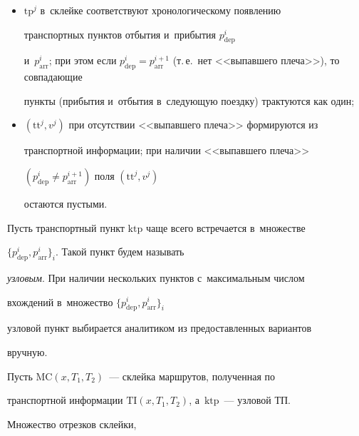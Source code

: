\begin{itemize}


\item $\mathrm{tp}^j$ в~склейке соответствуют хронологическому появлению 


транспортных пунктов отбытия и~прибытия $p^i_{\mathrm{dep}}$ 


и~$p^i_{\mathrm{arr}}$; при этом если $p^i_{\mathrm{dep}} = 


p^{i+1}_{\mathrm{arr}}$ (т.\,е.\ нет <<выпавшего плеча>>), то совпадающие 


пункты (прибытия и~отбытия в~сле\-ду\-ющую поездку) трактуются как один;\\[-9pt]


\item $(\mathrm{tt}^j, v^j)$ при отсутствии <<вы\-пав\-ше\-го плеча>> формируются из 


транспортной информации; при наличии <<вы\-пав\-ше\-го плеча>> 


$(p^i_{\mathrm{dep}}\not= p^{i+1}_{\mathrm{arr}})$ поля $(\mathrm{tt}^j, v^j)$ 


остаются пус\-тыми.


\end{itemize}





Пусть транспортный пункт $\mathrm{ktp}$ чаще всего встречается в~множестве 


$\{p^i_{\mathrm{dep}}, p^i_{\mathrm{arr}}\}_i$. Такой пункт будем называть 


\textit{узловым}. При наличии нескольких пунктов с~максимальным числом 


вхождений в~множество $\{p^i_{\mathrm{dep}}, p^i_{\mathrm{arr}}\}_i$ 


узловой пункт выбирается аналитиком из предоставленных вариантов 


вруч\-ную.


{





}





Пусть $\mathrm{MC}(x, T_1, T_2)$~--- склейка маршрутов, полученная по 


транспортной информации $\mathrm{TI}(x, T_1, T_2)$, а~$\mathrm{ktp}$~--- узловой ТП. 


Множество отрезков склейки,\linebreak\vspace*{-12pt}





